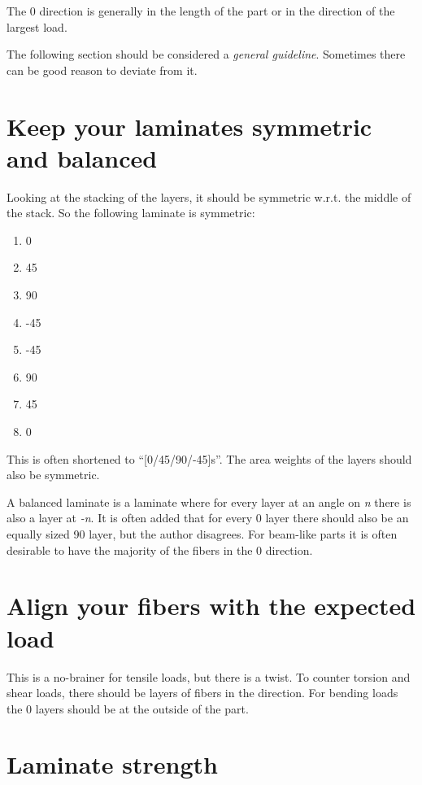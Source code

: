 \documentclass[a4paper,landscape,oneside,11pt,twocolumn]{memoir}
\begin{document}
The 0\textdegree{} direction is generally in the length of the part or in the
direction of the largest load.

The following section should be considered a \emph{general guideline}.
Sometimes there can be good reason to deviate from it.

\section{Keep your laminates symmetric and balanced} %

Looking at the stacking of the layers, it should be symmetric w.r.t. the
middle of the stack. So the following laminate is symmetric:

\begin{enumerate}
    \item 0\textdegree
    \item 45\textdegree
    \item 90\textdegree
    \item -45\textdegree
    \item -45\textdegree
    \item 90\textdegree
    \item 45\textdegree
    \item 0\textdegree
\end{enumerate}

This is often shortened to “[0/45/90/-45]s”. The area weights of the layers
should also be symmetric.

A balanced laminate is a laminate where for every layer at an angle on
\emph{n}\textdegree{} there is also a layer at \emph{-n}\textdegree.
It is often added that for every 0\textdegree{} layer there should also be an
equally sized 90\textdegree{} layer, but the author disagrees. For beam-like
parts it is often desirable to have the majority of the fibers in the
0\textdegree{} direction.

\section{Align your fibers with the expected load}

This is a no-brainer for tensile loads, but there is a twist. To counter
torsion and shear loads, there should be layers of fibers in the \textdegree{} direction.  For bending loads the 0\textdegree{} layers should
be at the outside of the part.

\section{Laminate strength}
\end{document}
